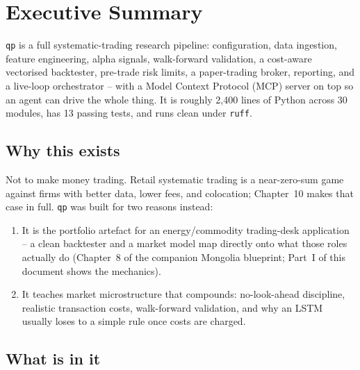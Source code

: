 \chapter*{Executive Summary}

\texttt{qp} is a full systematic-trading research pipeline: configuration,
data ingestion, feature engineering, alpha signals, walk-forward validation,
a cost-aware vectorised backtester, pre-trade risk limits, a paper-trading
broker, reporting, and a live-loop orchestrator -- with a Model Context
Protocol (MCP) server on top so an agent can drive the whole thing. It is
roughly 2{,}400 lines of Python across 30 modules, has 13 passing tests, and
runs clean under \texttt{ruff}.

\section*{Why this exists}

Not to make money trading. Retail systematic trading is a near-zero-sum game
against firms with better data, lower fees, and colocation; Chapter~10 makes
that case in full. \texttt{qp} was built for two reasons instead:

\begin{enumerate}
  \item It is the portfolio artefact for an energy/commodity trading-desk
  application -- a clean backtester and a market model map directly onto what
  those roles actually do (Chapter~8 of the companion Mongolia blueprint;
  Part~I of this document shows the mechanics).
  \item It teaches market microstructure that compounds: no-look-ahead
  discipline, realistic transaction costs, walk-forward validation, and why an
  LSTM usually loses to a simple rule once costs are charged.
\end{enumerate}

\section*{What is in it}


